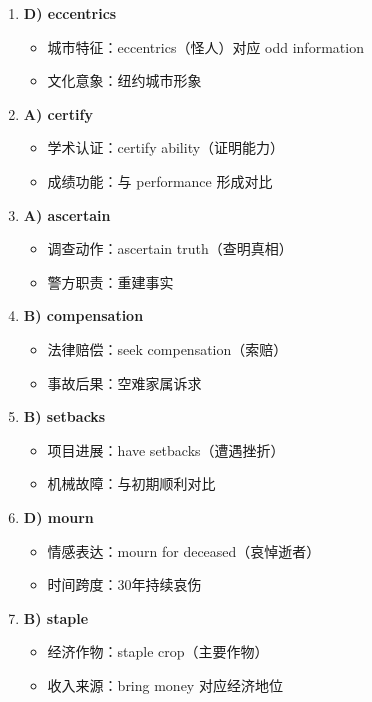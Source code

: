 \documentclass{article}
\begin{document}
\begin{enumerate}[resume*]
    \item \textbf{D) eccentrics} 
    \begin{itemize}
        \item 城市特征：eccentrics（怪人）对应 odd information
        \item 文化意象：纽约城市形象
    \end{itemize}
    
    \item \textbf{A) certify} 
    \begin{itemize}
        \item 学术认证：certify ability（证明能力）
        \item 成绩功能：与 performance 形成对比
    \end{itemize}
    
    \item \textbf{A) ascertain} 
    \begin{itemize}
        \item 调查动作：ascertain truth（查明真相）
        \item 警方职责：重建事实
    \end{itemize}
    
    \item \textbf{B) compensation} 
    \begin{itemize}
        \item 法律赔偿：seek compensation（索赔）
        \item 事故后果：空难家属诉求
    \end{itemize}
    
    \item \textbf{B) setbacks} 
    \begin{itemize}
        \item 项目进展：have setbacks（遭遇挫折）
        \item 机械故障：与初期顺利对比
    \end{itemize}
    
    \item \textbf{D) mourn} 
    \begin{itemize}
        \item 情感表达：mourn for deceased（哀悼逝者）
        \item 时间跨度：30年持续哀伤
    \end{itemize}
    
    \item \textbf{B) staple} 
    \begin{itemize}
        \item 经济作物：staple crop（主要作物）
        \item 收入来源：bring money 对应经济地位
    \end{itemize}
\end{enumerate}
\end{document}
